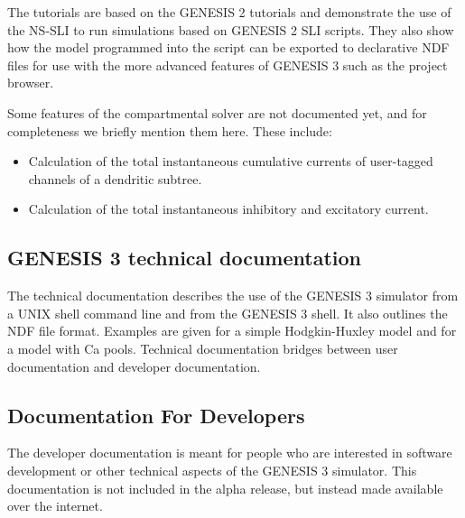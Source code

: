 \documentclass[12pt]{article}
\begin{document}
The tutorials are based on the GENESIS 2 tutorials and demonstrate the
use of the NS-SLI to run simulations based on GENESIS 2 SLI scripts.
They also show how the model programmed into the script can be
exported to declarative NDF files for use with the more advanced
features of GENESIS 3 such as the project browser.

Some features of the compartmental solver are not documented yet, and
for completeness we briefly mention them here.  These include:
\begin{itemize}
\item Calculation of the total instantaneous cumulative currents of
  user-tagged channels of a dendritic subtree.
\item Calculation of the total instantaneous inhibitory and excitatory
  current.
\end{itemize}


\subsection{GENESIS 3 technical documentation}
The technical documentation describes the use of the GENESIS 3
simulator from a UNIX shell command line and from the GENESIS 3 shell.
It also outlines the NDF file format.  Examples are given for a simple
Hodgkin-Huxley model and for a model with Ca pools.  Technical
documentation bridges between user documentation and developer
documentation.

\subsection{Documentation For Developers}

The developer documentation is meant for people who are interested in
software development or other technical aspects of the GENESIS 3
simulator.  This documentation is not included in the alpha release,
but instead made available over the internet.
\end{document}
